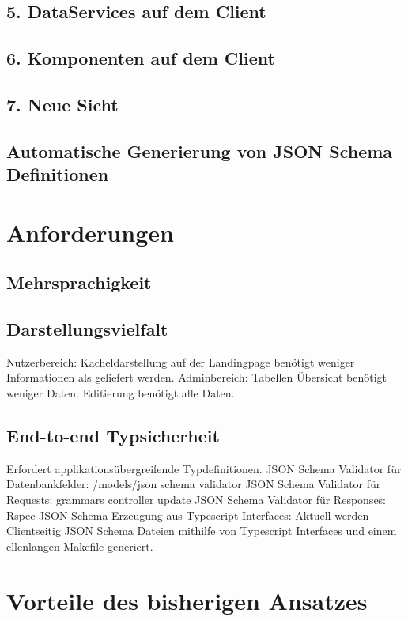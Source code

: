 \subsection{5. DataServices auf dem Client}
\subsection{6. Komponenten auf dem Client}
\subsection{7. Neue Sicht}
\subsection{Automatische Generierung von JSON Schema Definitionen}

\section{Anforderungen}

\subsection{Mehrsprachigkeit}

\subsection{Darstellungsvielfalt}
Nutzerbereich:
Kacheldarstellung auf der Landingpage benötigt weniger Informationen als geliefert werden.
Adminbereich:
Tabellen Übersicht benötigt weniger Daten. Editierung benötigt alle Daten.

\subsection{End-to-end Typsicherheit}
Erfordert applikationsübergreifende Typdefinitionen.
JSON Schema Validator für Datenbankfelder:
/models/json schema validator
JSON Schema Validator für Requests:
grammars controller update
JSON Schema Validator für Responses:
Rspec
JSON Schema Erzeugung aus Typescript Interfaces:
Aktuell werden Clientseitig JSON Schema Dateien mithilfe von Typescript Interfaces und einem ellenlangen Makefile generiert.

\section{Vorteile des bisherigen Ansatzes}
